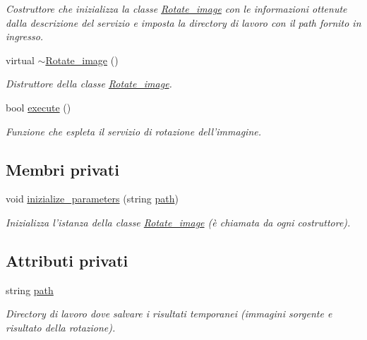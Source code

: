 \begin{DoxyCompactItemize}
\begin{DoxyCompactList}\small\item\em Costruttore che inizializza la classe \hyperlink{class_rotate__image}{Rotate\-\_\-image} con le informazioni ottenute dalla descrizione del servizio e imposta la directory di lavoro con il path fornito in ingresso. \end{DoxyCompactList}\item 
\hypertarget{class_rotate__image_a81aa40308590dff5f6df897bc96329f4}{virtual \hyperlink{class_rotate__image_a81aa40308590dff5f6df897bc96329f4}{$\sim$\-Rotate\-\_\-image} ()}\label{class_rotate__image_a81aa40308590dff5f6df897bc96329f4}

\begin{DoxyCompactList}\small\item\em Distruttore della classe \hyperlink{class_rotate__image}{Rotate\-\_\-image}. \end{DoxyCompactList}\item 
bool \hyperlink{class_rotate__image_a58d6614345b8c9a70c7b052be314b5d7}{execute} ()
\begin{DoxyCompactList}\small\item\em Funzione che espleta il servizio di rotazione dell'immagine. \end{DoxyCompactList}\end{DoxyCompactItemize}
\subsection*{Membri privati}
\begin{DoxyCompactItemize}
\item 
void \hyperlink{class_rotate__image_a347de309e790cea7c72b5ff47c1591ce}{inizialize\-\_\-parameters} (string \hyperlink{class_rotate__image_a30a932131de7296fef03f8c47d65594e}{path})
\begin{DoxyCompactList}\small\item\em Inizializza l'istanza della classe \hyperlink{class_rotate__image}{Rotate\-\_\-image} (è chiamata da ogni costruttore). \end{DoxyCompactList}\end{DoxyCompactItemize}
\subsection*{Attributi privati}
\begin{DoxyCompactItemize}
\item 
\hypertarget{class_rotate__image_a30a932131de7296fef03f8c47d65594e}{string \hyperlink{class_rotate__image_a30a932131de7296fef03f8c47d65594e}{path}}\label{class_rotate__image_a30a932131de7296fef03f8c47d65594e}

\begin{DoxyCompactList}\small\item\em Directory di lavoro dove salvare i risultati temporanei (immagini sorgente e risultato della rotazione). \end{DoxyCompactList}\end{DoxyCompactItemize}
